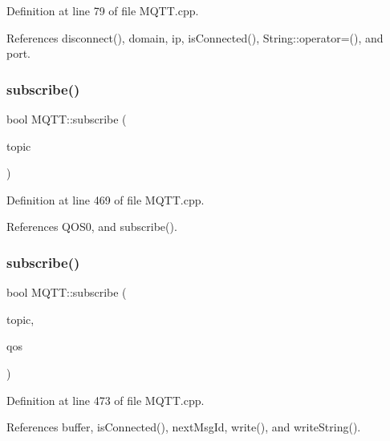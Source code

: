 Definition at line 79 of file M\+Q\+T\+T.\+cpp.



References disconnect(), domain, ip, is\+Connected(), String\+::operator=(), and port.

\mbox{\label{class_m_q_t_t_aad37921199d922122e1d390883ab6591}} 
\subsubsection{\texorpdfstring{subscribe()}{subscribe()}\hspace{0.1cm}{\footnotesize\ttfamily [1/2]}}
{\footnotesize\ttfamily bool M\+Q\+T\+T\+::subscribe (\begin{DoxyParamCaption}\item[{const char $\ast$}]{topic }\end{DoxyParamCaption})}



Definition at line 469 of file M\+Q\+T\+T.\+cpp.



References Q\+O\+S0, and subscribe().

\mbox{\label{class_m_q_t_t_ac619e73524dcc0aa2c70ae160d7b6689}} 
\subsubsection{\texorpdfstring{subscribe()}{subscribe()}\hspace{0.1cm}{\footnotesize\ttfamily [2/2]}}
{\footnotesize\ttfamily bool M\+Q\+T\+T\+::subscribe (\begin{DoxyParamCaption}\item[{const char $\ast$}]{topic,  }\item[{\hyperlink{class_m_q_t_t_aff501e08e20ebf26b3272fcc0e7215ff}{E\+M\+Q\+T\+T\+\_\+\+Q\+OS}}]{qos }\end{DoxyParamCaption})}



Definition at line 473 of file M\+Q\+T\+T.\+cpp.



References buffer, is\+Connected(), next\+Msg\+Id, write(), and write\+String().



